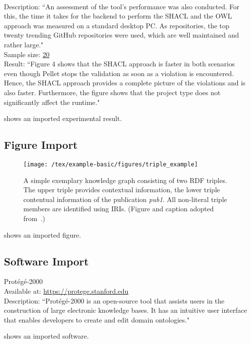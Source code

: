 \begin{expresult}\\
Description: ``An assessment of the tool’s performance was also conducted. For this, the time it takes for the backend to perform the SHACL and the OWL approach was measured on a standard desktop PC. As repositories, the top twenty trending GitHub repositories were used, which are well maintained and rather large."~\cite{martin2022specification}\\
Sample size: \url{20}\\
Result: ``Figure 4 shows that the SHACL approach is faster in both scenarios even though Pellet stops the validation as soon as a violation is encountered. Hence, the SHACL approach provides a complete picture of the violations and is also faster. Furthermore, the figure shows that the project type does not significantly affect the runtime."~\cite{martin2022specification}\\
\label{expresult:quare-performance}
\end{expresult}
 shows an imported experimental result.

\subsection{Figure Import}

\begin{figure}[htb!]
\centering
\texttt{[image: /tex/example-basic/figures/triple\_example]}
\caption{A simple exemplary knowledge graph consisting of two RDF triples. The upper triple provides contextual information, the lower triple contentual information of the publication \emph{{pub1}}. All non-literal triple members are identified using IRIs. (Figure and caption adopted from~\cite{Martin21}.)}
\label{fig:contentual-contextual}
\end{figure}
 shows an imported figure.

\subsection{Software Import}

\begin{software}
Prot{\'{e}}g{\'{e}}-2000~\cite{DBLP:conf/amia/NoyCFKTVM03}\\
Available at: \url{https://protege.stanford.edu}\\
Description: ``Prot\'{e}g\'{e}-2000 is an open-source tool that assists users in the construction of large electronic knowledge bases. It has an intuitive user interface that enables developers to create and edit domain ontologies."~\cite{DBLP:conf/amia/NoyCFKTVM03}
\label{software:protege}
\end{software}
 shows an imported software.



